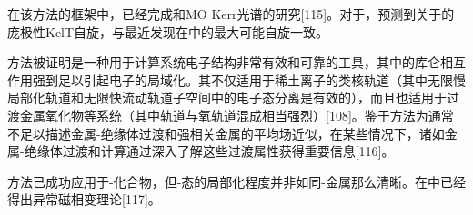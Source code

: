 在该方法的框架中，已经完成和MO Kerr光谱的研究[115]。对于，预测到关于的庞极性KelT自旋，与最近发现在中的最大可能自旋一致。

方法被证明是一种用于计算系统电子结构非常有效和可靠的工具，其中的库仑相互作用强到足以引起电子的局域化。其不仅适用于稀土离子的类核轨道（其中无限慢局部化轨道和无限快流动轨道子空间中的电子态分离是有效的），而且也适用于过渡金属氧化物等系统（其中轨道与氧轨道混成相当强烈）[108]。鉴于方法为通常不足以描述金属-绝缘体过渡和强相关金属的平均场近似，在某些情况下，诸如金属-绝缘体过渡和计算通过深入了解这些过渡属性获得重要信息[116]。

方法已成功应用于-化合物，但-态的局部化程度并非如同-金属那么清晰。在中已经得出异常磁相变理论[117]。 

